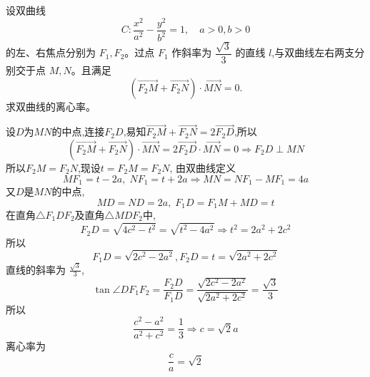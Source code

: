\begin{questions}
    \question 设双曲线 
    \[
    C: \frac{x^{2}}{a^{2}} - \frac{y^{2}}{b^{2}} = 1, \quad a > 0, b > 0
    \]
    的左、右焦点分别为 $F_1, F_2$。过点 $F_1$ 作斜率为 $\dfrac{\sqrt{3}}{3}$ 的直线 $l$,与双曲线左右两支分别交于点 $M, N$。且满足
    \[
    (\overrightarrow{F_2 M} + \overrightarrow{F_2 N}) \cdot \overrightarrow{M N} = 0.
    \]
    求双曲线的离心率。
        \begin{solution}
        设$D$为$MN$的中点,连接$F_{2}D$,易知$\overrightarrow{F_{2}M}+\overrightarrow{F_{2}N}=2\overrightarrow{F_{2}D}$,所以
        \[
        (\overrightarrow{F_{2}M}+\overrightarrow{F_{2}N})\cdot\overrightarrow{MN}=2\overrightarrow{F_{2}D}\cdot\overrightarrow{MN}=0\Rightarrow F_{2}D \perp MN
        \]
        所以$F_{2}M=F_{2}N$,现设$t=F_{2}M=F_{2}N$,
        由双曲线定义
        \[
        MF_{1}=t-2a,\;NF_{1}=t+2a\Rightarrow MN=NF_{1}-MF_{1}=4a
        \]
        又$D$是$MN$的中点,
        \[
        MD=ND=2a,\;F_{1}D=F_{1}M+MD=t
        \]
        在直角$\triangle F_{1}DF_{2}$及直角$\triangle MDF_{2}$中,
        \[
        F_{2}D=\sqrt{4c^{2}-t^{2}}=\sqrt{t^{2}-4a^{2}}\Rightarrow t^{2}=2a^{2}+2c^{2}
        \]
        所以 
        \[
        F_{1}D=\sqrt{2c^{2}-2a^{2}}, F_{2}D=t=\sqrt{2a^{2}+2c^{2}}
        \]
        直线的斜率为 $\frac{\sqrt{3}}{3}$,
        \[
        \tan\angle DF_{1}F_{2}=\frac{F_{2}D}{F_{1}D}=\frac{\sqrt{2c^{2}-2a^{2}}}{\sqrt{2a^{2}+2c^{2}}}=\frac{\sqrt{3}}{3}
        \]
        所以
        \[
        \frac{c^{2}-a^{2}}{a^{2}+c^{2}}=\frac{1}{3}\Rightarrow c=\sqrt{2}a
        \]
        离心率为 
        \[
        \frac{c}{a}=\sqrt{2}
        \]
    \end{solution}
    

\end{questions}
